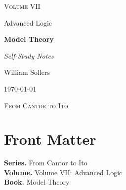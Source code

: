 \documentclass[12pt, a4paper]{report}
\begin{document}
\ExplSyntaxOff
\renewcommand{\familydefault}{\rmdefault}

\begin{titlepage}
\centering
\vspace*{3.5cm}

{\Large\scshape Volume VII\par}
\vspace{0.35cm}
{\large Advanced Logic\par}

\vspace{1.4cm}

{\Huge\bfseries Model Theory\par}

\vspace{0.6cm}
{\large\itshape Self-Study Notes\par}

\vfill

{\large William Sollers\par}
\vspace{0.35cm}
{\large \today\par}

\vfill

{\large\scshape From Cantor to Ito\par}
\end{titlepage}

\clearpage
\thispagestyle{plain}
\chapter*{Front Matter}
\noindent\textbf{Series.} From Cantor to Ito\\[0.5em]
\textbf{Volume.} Volume VII: Advanced Logic\\[0.5em]
\textbf{Book.} Model Theory

\clearpage
\tableofcontents
\clearpage
{}



\clearpage



\printindex[tech]
\printindex[dep]
\end{document}
